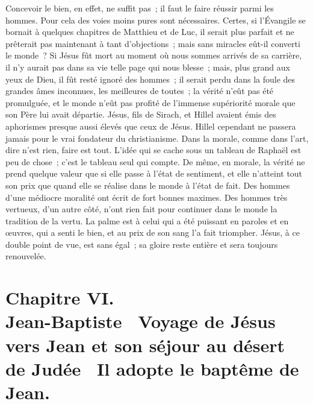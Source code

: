 \documentclass[french,twoside]{book} %
\newcommand\chapteropen{} %
\newcommand\chapterclose{} %
\begin{document}
Concevoir le bien, en effet, ne suffit pas ; il faut le faire réussir parmi les hommes. Pour cela des voies moins pures sont nécessaires. Certes, si l’Évangile se bornait à quelques chapitres de Matthieu et de Luc, il serait plus parfait et ne prêterait pas maintenant à tant d’objections ; mais sans miracles eût-il converti le monde ? Si Jésus fût mort au moment où nous sommes arrivés de sa carrière, il n’y aurait pas dans sa vie telle page qui nous blesse ; mais, plus grand aux yeux de Dieu, il fût resté ignoré des hommes ; il serait perdu dans la foule des grandes âmes inconnues, les meilleures de toutes ; la vérité n’eût pas été promulguée, et le monde n’eût pas profité de l’immense supériorité morale que son Père lui avait départie. Jésus, fils de Sirach, et Hillel avaient émis des aphorismes presque aussi élevés que ceux de Jésus. Hillel cependant ne passera jamais pour le vrai fondateur du christianisme. Dans la morale, comme dans l’art, dire n’est rien, faire est tout. L’idée qui se cache sous un tableau de Raphaël est peu de chose ; c’est le tableau seul qui compte. De même, en morale, la vérité ne prend quelque valeur que si elle passe à l’état de sentiment, et elle n’atteint tout son prix que quand elle se réalise dans le monde à l’état de fait. Des hommes d’une médiocre moralité ont écrit de fort bonnes maximes. Des hommes très vertueux, d’un autre côté, n’ont rien fait pour continuer dans le monde la tradition de la vertu. La palme est à celui qui a été puissant en paroles et en œuvres, qui a senti le bien, et au prix de son sang l’a fait triompher. Jésus, à ce double point de vue, est sans égal ; sa gloire reste entière et sera toujours renouvelée.
\chapterclose


\chapteropen
\chapter[{Chapitre VI. Jean-Baptiste  Voyage de Jésus vers Jean et son séjour au désert de Judée  Il adopte le baptême de Jean.}]{Chapitre VI.\\
Jean-Baptiste  Voyage de Jésus vers Jean et son séjour au désert de Judée  Il adopte le baptême de Jean.}\renewcommand{\leftmark}{Chapitre VI.\\
Jean-Baptiste  Voyage de Jésus vers Jean et son séjour au désert de Judée  Il adopte le baptême de Jean.}
\end{document}
